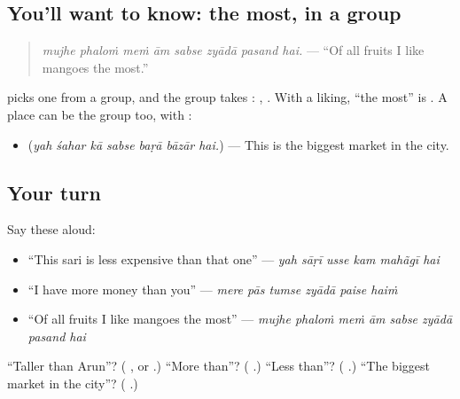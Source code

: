 \subsection*{You'll want to know: the most, in a group}
\begin{quote}
\textbf{       }
\end{quote}

\begin{quote}
\emph{mujhe phaloṁ meṁ ām sabse zyādā pasand hai.} — \textquotedblleft{}Of all fruits I like mangoes the most.\textquotedblright{}
\end{quote}

\textbf{} picks one from a group, and the group takes \textbf{}: \textbf{ }, \textbf{  }. With a liking, \textquotedblleft{}the most\textquotedblright{} is \textbf{ }. A place can be the group too, with \textbf{}:

\begin{itemize}
\raggedright
  \item \textbf{      } (\emph{yah śahar kā sabse baṛā bāzār hai.}) — This is the biggest market in the city.
\end{itemize}

\subsection*{Your turn}
Say these aloud:

\begin{itemize}
\raggedright
  \item \textquotedblleft{}This sari is less expensive than that one\textquotedblright{} — \emph{yah sāṛī usse kam mahãgī hai}
  \item \textquotedblleft{}I have more money than you\textquotedblright{} — \emph{mere pās tumse zyādā paise haiṁ}
  \item \textquotedblleft{}Of all fruits I like mangoes the most\textquotedblright{} — \emph{mujhe phaloṁ meṁ ām sabse zyādā pasand hai}
\end{itemize}

\begin{tcolorbox}[breakable,colback=teal!4,colframe=teal!35!black,title={Before you move on}]
\textquotedblleft{}Taller than Arun\textquotedblright{}? (\textbf{  }, or \textbf{}.) \textquotedblleft{}More than\textquotedblright{}? (\textbf{ }.) \textquotedblleft{}Less than\textquotedblright{}? (\textbf{ }.) \textquotedblleft{}The biggest market in the city\textquotedblright{}? (\textbf{    }.)
\end{tcolorbox}
